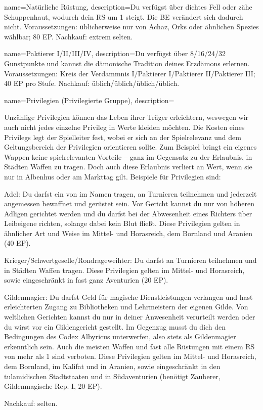 {
    name={Natürliche Rüstung},
    description={Du verfügst über dichtes Fell oder zähe Schuppenhaut, wo­durch dein RS um 1 steigt. Die BE verändert sich dadurch nicht. Voraussetzungen: üblicherweise nur von Achaz, Orks oder ähnlichen Spezies wählbar; 80 EP. Nachkauf: extrem selten.}}

{
    name={Paktierer I/II/III/IV},
    description={Du verfügst über 8/16/24/32 Gunstpunkte und kannst die dämonische Tradition deines Erzdämons erlernen. Voraussetzungen: Kreis der Verdammnis I/Paktierer I/Paktierer II/Paktierer III; 40 EP pro Stufe. Nachkauf: üblich/üblich/üblich/üblich.}}

{
    name={Privilegien (Privilegierte Gruppe)},
    description={Unzählige Privilegien können das Leben ihrer Träger erleichtern, weswegen wir auch nicht jedes einzelne Privileg in Werte kleiden möchten. Die Kosten eines Privilegs legt der Spielleiter fest, wobei er sich an der Spielrelevanz und dem Geltungsbereich der Privilegien orientieren sollte. Zum Beispiel bringt ein eigenes Wappen keine spielrelevanten Vorteile – ganz im Gegensatz zu der Erlaubnis, in Städten Waffen zu tragen. Doch auch diese Erlaubnis verliert an Wert, wenn sie nur in Albenhus oder am Markttag gilt. Beispiele für Privilegien sind:
\begin{description}
\item Adel: Du darfst ein \glqq von\grqq{} im Namen tragen, an Turnieren teilnehmen und jederzeit angemessen bewaffnet und gerüstet sein. Vor Gericht kannst du nur von höheren Adligen gerichtet werden und du darfst bei der Abwesenheit eines Richters über Leibeigene richten, solange dabei kein Blut fließt. Diese Privilegien gelten in ähnlicher Art und Weise im Mittel- und Horasreich, dem Bornland und Aranien (40 EP).
\item Krieger/Schwertgeselle/Rondrageweihter: Du darfst an Turnieren teilnehmen und in Städten Waffen tragen. Diese Privilegien gelten im Mittel- und Horasreich, sowie eingeschränkt in fast ganz Aventurien (20 EP).
\item Gildenmagier: Du darfst Geld für magische Dienstleistungen verlangen und hast erleichterten Zugang zu Bibliotheken und Lehrmeistern der eigenen Gilde. Von weltlichen Gerichten kannst du nur in deiner Anwesenheit verurteilt werden oder du wirst vor ein Gildengericht gestellt. Im Gegenzug musst du dich den Bedingungen des Codex Albyricus unterwerfen, also stets als Gildenmagier erkenntlich sein. Auch die meisten Waffen und fast alle Rüstungen mit einem RS von mehr als 1 sind verboten. Diese Privilegien gelten im Mittel- und Horasreich, dem Bornland, im Kalifat und in Aranien, sowie eingeschränkt in den tulamidischen Stadtstaaten und in Südaventurien (benötigt Zauberer, Gildenmagische Rep. I, 20 EP).
\end{description}
Nachkauf: selten.}}


